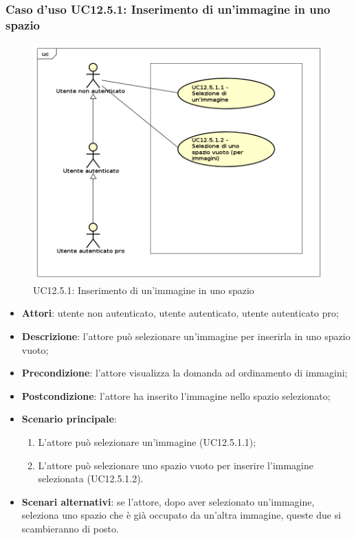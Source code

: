 \subsubsection{Caso d'uso UC12.5.1: Inserimento di un'immagine in uno spazio}
\label{UC12.5.1}
\begin{figure}[h]
	\centering
	\includegraphics[scale=0.5]{UML/UC12_5_1.png}
	\caption{UC12.5.1: Inserimento di un'immagine in uno spazio}
\end{figure}
\begin{itemize}
\item \textbf{Attori}: utente non autenticato, utente autenticato, utente autenticato pro;
\item \textbf{Descrizione}: l'attore può selezionare un'immagine per inserirla in uno spazio vuoto;
\item \textbf{Precondizione}: l'attore visualizza la domanda ad ordinamento di immagini;
\item \textbf{Postcondizione}: l'attore ha inserito l'immagine nello spazio selezionato;
\item \textbf{Scenario principale}: 
\begin{enumerate}
\item L'attore può selezionare un'immagine (UC12.5.1.1);
\item L'attore può selezionare uno spazio vuoto per inserire l'immagine selezionata (UC12.5.1.2).
\end{enumerate}
\item \textbf{Scenari alternativi}: se l'attore, dopo aver selezionato un'immagine, seleziona uno spazio che è già occupato da un'altra immagine, queste due si scambieranno di posto.
\end{itemize}

